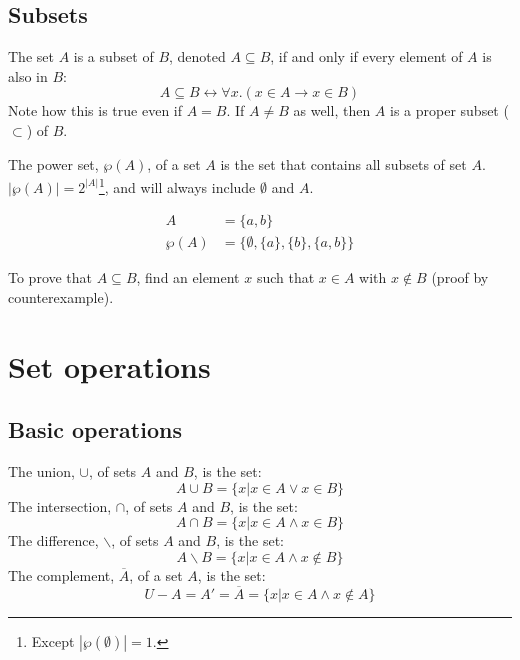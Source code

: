 \subsection{Subsets}
The set \(A\) is a subset of \(B\), denoted \(A \subseteq B\), if and only if every element of \(A\) is also in \(B\):
\begin{equation*}
    \label{eq:subset}
    A \subseteq B \leftrightarrow \forall x. (x \in A \rightarrow x \in B)
\end{equation*}
Note how this is true even if \(A = B\). If \(A \neq B\) as well, then \(A\) is a proper subset (\(\subset\)) of \(B\).

The power set, \(\wp(A)\), of a set \(A\) is the set that contains all subsets of set \(A\). \(|\wp(A)| = 2^{|A|}\)\footnote{Except \(|\wp(\emptyset)| = 1\).}, and will always include \(\emptyset\) and \(A\).
\begin{example}
    \begin{align*}
        A      & = \{a, b\}                              \\
        \wp(A) & = \{\emptyset, \{a\}, \{b\}, \{a, b\}\}
    \end{align*}
\end{example}
To prove that \(A \subseteq B\), find an element \(x\) such that \(x \in A\) with \(x \notin B\) (proof by counterexample).

\section{Set operations}
\subsection{Basic operations}
The union, \(\cup\), of sets \(A\) and \(B\), is the set:
\begin{equation*}
    A \cup B = \{x | x \in A \lor x \in B\}
\end{equation*}
The intersection, \(\cap\), of sets \(A\) and \(B\), is the set:
\begin{equation*}
    A \cap B = \{x | x \in A \land x \in B\}
\end{equation*}
The difference, \(\backslash\), of sets \(A\) and \(B\), is the set:
\begin{equation*}
    A \backslash B = \{x | x \in A \land x \notin B\}
\end{equation*}
The complement, \(\overline{A}\), of a set \(A\), is the set:
\begin{equation*}
    U - A = A' = \overline{A} = \{x | x \in A \land x \notin A\}
\end{equation*}

